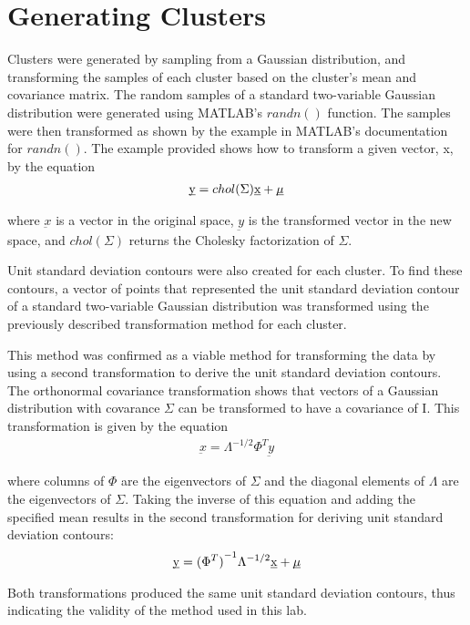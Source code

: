 \section{Generating Clusters}
Clusters were generated by sampling from a Gaussian distribution, and transforming the samples of each cluster based on the cluster's mean and covariance matrix. The random samples of a standard two-variable Gaussian distribution were generated using MATLAB's $randn()$ function. The samples were then transformed as shown by the example in MATLAB's documentation for $randn()$. The example provided shows how to transform a given vector, x, by the equation
\begin{eqnarray}
\label{eqn:chol_transform}
\underbar {y} = chol(\Sigma) \underbar {x} + \underbar {$\mu$}
\end{eqnarray}

where $\underbar{x}$ is a vector in the original space, $\underbar{y}$ is the transformed vector in the new space, and $chol(\Sigma)$ returns the Cholesky factorization of $\Sigma$.

Unit standard deviation contours were also created for each cluster. To find these contours, a vector of points that represented the unit standard deviation contour of a standard two-variable Gaussian distribution was transformed using the previously described transformation method for each cluster.

This method was confirmed as a viable method for transforming the data by using a second transformation to derive the unit standard deviation contours. The orthonormal covariance transformation shows that vectors of a Gaussian distribution with covarance $\Sigma$ can be transformed to have a covariance of I. This transformation is given by the equation
\begin{eqnarray}
\label{eqn:ortho_transform}
\underbar{x} = {\Lambda}^{-1/2} \Phi^T \underbar{y}
\end{eqnarray}

where columns of $\Phi$ are the eigenvectors of $\Sigma$ and the diagonal elements of $\Lambda$ are the eigenvectors of $\Sigma$. Taking the inverse of this equation and adding the specified mean results in the second transformation for deriving unit standard deviation contours:
\begin{eqnarray}
\label{eqn:ortho_inv_transform}
\underbar{y} = {(\Phi^{T})}^{-1} \Lambda^{-1/2}\underbar{x}+\underbar{$\mu$}
\end{eqnarray}

Both transformations produced the same unit standard deviation contours, thus indicating the validity of the method used in this lab.
 
